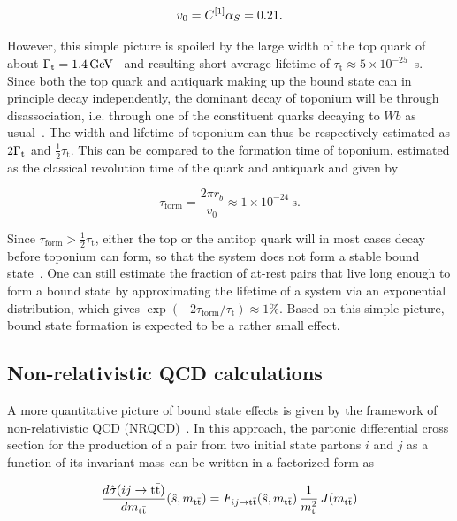 \begin{equation}
  v_0 = C^{[1]} \alpha_S = 0.21 .
\end{equation}

However, this simple picture is spoiled by the large width of the top quark of about $\Gammat = \SI{1.4}{\GeV}$~\cite{PDG:2022pth} and resulting short average lifetime of $\tau_\mathrm{t} \approx 5 \times 10^{-25}$~s. Since both the top quark and antiquark making up the bound state can in principle decay independently, the dominant decay of toponium will be through disassociation, i.e. through one of the constituent quarks decaying to $Wb$ as usual~\cite{Fabiano:1994cz}. The width and lifetime of toponium can thus be respectively estimated as $2 \Gamma_{\mathrm{t}}$ and $\frac{1}{2} \tau_\mathrm{t}$. This can be compared to the formation time of toponium, estimated as the classical revolution time of the quark and antiquark and given by~\cite{Maltoni:LHCTopWG}

\begin{equation}
  \tau_{\mathrm{form}} = \frac{2 \pi r_b}{v_0} \approx 1 \times 10^{-24}~\si{\second} .
\end{equation}

Since $\tau_{\mathrm{form}} > \frac{1}{2} \tau_\mathrm{t}$, either the top or the antitop quark will in most cases decay before toponium can form, so that the \ttbar system does not form a stable bound state~\cite{Fabiano:1994cz,Fadin:1987}. One can still estimate the fraction of at-rest \ttbar pairs that live long enough to form a bound state by approximating the lifetime of a \ttbar system via an exponential distribution, which gives $\exp(-2 \tau_{\mathrm{form}} / \tau_\mathrm{t}) \approx 1\%$. Based on this simple picture, \ttbar bound state formation is expected to be a rather small effect.

\subsection{Non-relativistic QCD calculations}

A more quantitative picture of \ttbar bound state effects is given by the framework of non-relativistic QCD (NRQCD)~\cite{Fadin:1990wx,Sumino:2010bv,Kiyo:2008bv,Garzelli:2024uhe}. 
In this approach, the partonic differential cross section for the production of a \ttbar pair from two initial state partons $i$ and $j$ as a function of its invariant mass \mtt can be written in a factorized form as~\cite{Kiyo:2008bv}

\begin{equation}
\label{eq:theory:ttbar_factorization}
  \frac{d \hat{\sigma}(ij \rightarrow \mathrm{t \bar{t}})}{d m_{\mathrm{t \bar{t}}}} (\hat{s}, m_{\mathrm{t \bar{t}}}) = F_{ij \rightarrow \mathrm{t \bar{t}}} (\hat{s}, m_{\mathrm{t \bar{t}}}) \, \frac{1}{m_{\mathrm{t}}^2} \, J (m_{\mathrm{t \bar{t}}})
\end{equation}

